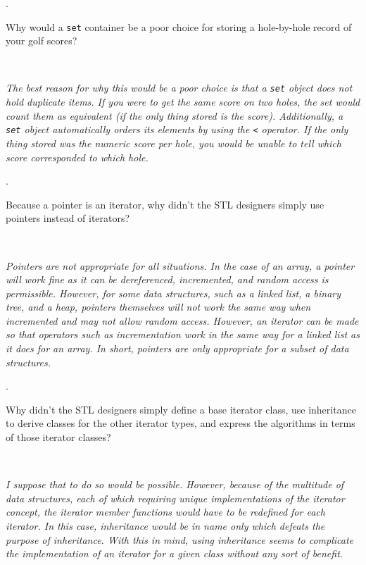 \documentclass{amsart}
\begin{document}
. 
\begin{minipage}[t]{11.5 cm}
	Why would a \texttt{set} container be a poor choice for storing a hole-by-hole record of your golf scores?
\end{minipage} \\[1ex]
\phantom{3. } 
\begin{minipage}[t]{11.5 cm}
	{\slshape 
		The best reason for why this would be a poor choice is that
		a \verb+set+ object does not hold duplicate items.
		If you were to get the same score on two holes, the
		set would count them as equivalent (if the only thing stored
		is the score).
		Additionally, a \verb+set+ object automatically orders its 
		elements by using the \verb+<+ operator.
		If the only thing stored was the numeric score per hole,
		you would be unable to tell which score corresponded to which
		hole. 
	}
\end{minipage} 
\vfill

. 
\begin{minipage}[t]{11.5 cm}
	Because a pointer is an iterator, why didn't the STL designers simply use pointers instead of iterators?
\end{minipage} \\[1ex]
\phantom{2. } 
\begin{minipage}[t]{11.5 cm}
	{\slshape 
		Pointers are not appropriate for all situations.
		In the case of an array, a pointer will work fine as it 
		can be dereferenced, incremented, and random access is 
		permissible. 
		However, for some data structures, such as a linked list,
		a binary tree, and a heap, pointers themselves
		will not work the same way when incremented and 
		may not allow random access.
		However, an iterator can be made so that operators such 
		as incrementation work in the same way for a linked list
		as it does for an array.
		In short, pointers are only appropriate for a subset of
		data structures. 
	} 
\end{minipage} 
\vfill
\newpage

\phantom{\quad}\vfill
{}. 
\begin{minipage}[t]{11.5 cm}
	Why didn't the STL designers simply define a base iterator class, use inheritance to derive classes for the other iterator types, and express the algorithms in terms of those iterator classes?
\end{minipage} \\[1ex]
\phantom{3. } 
\begin{minipage}[t]{11.5 cm}
	{\slshape 
		I suppose that to do so would be possible. 
		However, because of the multitude of data structures, 
		each of which requiring unique implementations of
		the iterator concept, the iterator member functions
		would have to be redefined for each iterator.
		In this case, inheritance would be in name only
		which defeats the purpose of inheritance.
		With this in mind, using inheritance seems to complicate
		the implementation of an iterator for a given class
		without any sort of benefit.
	} 
\end{minipage} 
\vfill
\end{document}
